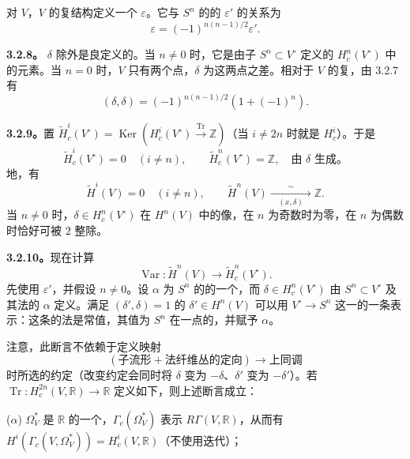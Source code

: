 对 $V$，$V$ 的复结构定义一个 $\varepsilon$。它与 $S^n$ 的的 $\varepsilon'$ 的关系为
\[
 \varepsilon=(-1)^{n(n-1)/2}\varepsilon'.
\]

\textbf{3.2.8。} $\delta$ 除外是良定义的。当 $n\neq0$ 时，它是由子 $S^n\subset V^\circ$ 定义的 $H_c^n(V^\circ)$ 中的元素。当 $n=0$ 时，$V$ 只有两个点，$\delta$ 为这两点之差。相对于 $V$ 的复，由 3.2.7 有
\[
 (\delta,\delta)=(-1)^{n(n-1)/2}(1+(-1)^n).\tag{3.2.8.1}
\]

\textbf{3.2.9。}置 $\widetilde H_c^i(V^\circ)=\operatorname{Ker}(H_c^i(V^\circ)\xrightarrow{\operatorname{Tr}}\mathbb Z)$（当 $i\neq2n$ 时就是 $H_c^i$）。于是
\[
 \widetilde H_c^i(V^\circ)=0\quad(i\neq n),\qquad
 \widetilde H_c^n(V^\circ)=\mathbb Z,\quad\text{由 }\delta\text{ 生成。}
\]
地，有
\[
 \widetilde H^i(V)=0\quad(i\neq n),\qquad
 \widetilde H^n(V)\xrightarrow[\quad(x,\delta)\quad]{\sim}\mathbb Z.
\]
当 $n\neq0$ 时，$\delta\in H_c^n(V^\circ)$ 在 $H^n(V)$ 中的像，在 $n$ 为奇数时为零，在 $n$ 为偶数时恰好可被 $2$ 整除。

\textbf{3.2.10。}现在计算
\[
 \operatorname{Var}:\widetilde H^n(V)\longrightarrow\widetilde H_c^n(V^\circ).
\]
先使用 $\varepsilon'$，并假设 $n\neq0$。设 $\alpha$ 为 $S^n$ 的的一个，而 $\delta\in H_c^n(V^\circ)$ 由 $S^n\subset V^\circ$ 及其法的 $\alpha$ 定义。满足 $(\delta',\delta)=1$ 的 $\delta'\in H^n(V)$ 可以用 $V^\circ\to S^n$ 这一的一条表示：这条的法是常值，其值为 $S^n$ 在一点的，并赋予 $\alpha$。

注意，此断言不依赖于定义映射
\[
 (\text{子流形}+\text{法纤维丛的定向})\longrightarrow\text{上同调}
\]
时所选的约定（改变约定会同时将 $\delta$ 变为 $-\delta$、$\delta'$ 变为 $-\delta'$）。若 $\operatorname{Tr}:H_c^{2n}(V,\mathbb R)\to\mathbb R$ 定义如下，则上述断言成立：

($\alpha$) $\Omega_V^*$ 是 $\mathbb R$ 的一个，$\Gamma_c(\Omega_V^*)$ 表示 $R\Gamma(V,\mathbb R)$，从而有 $H^i(\Gamma_c(V,\Omega_V^*))=H_c^i(V,\mathbb R)$（不使用迭代）；

